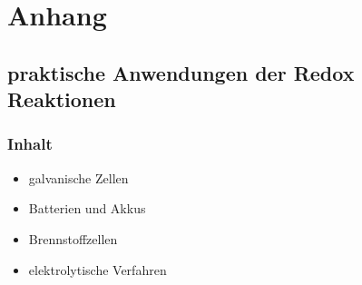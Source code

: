 \section{Anhang}

\subsection{praktische Anwendungen der Redox Reaktionen}

\subsubsection{Inhalt} %
\begin{itemize}
	\item galvanische Zellen
	\item  Batterien und Akkus
	\item  Brennstoffzellen
	\item  elektrolytische Verfahren
\end{itemize}
